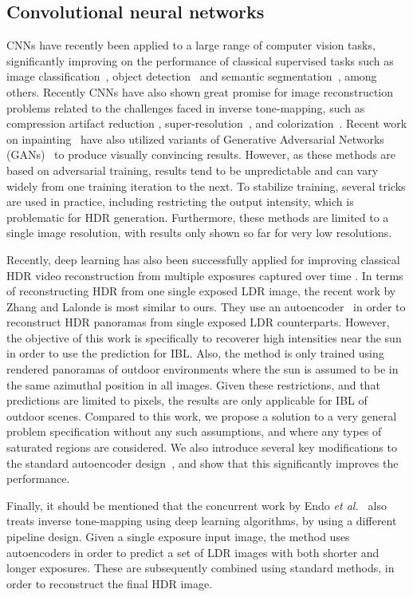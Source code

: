 \documentclass[acmtog]{acmart}
\newcommand{\etal}{\emph{et al.\ }}
\newcommand\customsection[1]{\subsection{#1}}
\begin{document}
\customsection{Convolutional neural networks} 
CNNs have recently been applied to a large range of computer vision tasks, significantly improving on the performance of classical supervised tasks such as image classification~\cite{Simonyan2014}, object detection~\cite{ren2015faster} and semantic segmentation~\cite{Long2015}, among others. Recently CNNs have also shown great promise for image reconstruction problems related to the challenges faced in inverse tone-mapping, such as compression artifact reduction \cite{Svoboda2016}, super-resolution~\cite{Ledig2016}, and colorization~\cite{Iizuka2016}.
Recent work on inpainting~\cite{Pathak2016,yang2016high} have also utilized variants of Generative Adversarial Networks (GANs)~\cite{Goodfellow2014} to produce visually convincing results. However, as these methods are based on adversarial training, results tend to be unpredictable and can vary widely from one training iteration to the next. To stabilize training, several tricks are used in practice, including restricting the output intensity, which is problematic for HDR generation. Furthermore, these methods are limited to a single image resolution, with results only shown so far for very low resolutions.

Recently, deep learning has also been successfully applied for improving classical HDR video reconstruction from multiple exposures captured over time \cite{Kalantari2017}. 
In terms of reconstructing HDR from one single exposed LDR image, the recent work by Zhang and Lalonde \citeyear{Zhang2017} is most similar to ours. They use an autoencoder~\cite{hinton2006reducing} in order to reconstruct HDR panoramas from single exposed LDR counterparts. 
However, the objective of this work is specifically to recoverer high intensities near the sun in order to use the prediction for IBL. Also, the method is only trained using rendered panoramas of outdoor environments where the sun is assumed to be in the same azimuthal position in all images.
Given these restrictions, and that predictions are limited to  pixels, the results are only applicable for IBL of outdoor scenes. Compared to this work, we propose a solution to a very general problem specification without any such assumptions, and where any types of saturated regions are considered. We also introduce several key modifications to the standard autoencoder design~\cite{hinton2006reducing}, and show that this significantly improves the performance.

Finally, it should be mentioned that the concurrent work by Endo \etal \citeyear{Endo2017} also treats inverse tone-mapping using deep learning algorithms, by using a different pipeline design. Given a single exposure input image, the method uses autoencoders in order to predict a set of LDR images with both shorter and longer exposures. These are subsequently combined using standard methods, in order to reconstruct the final HDR image. 
\end{document}
